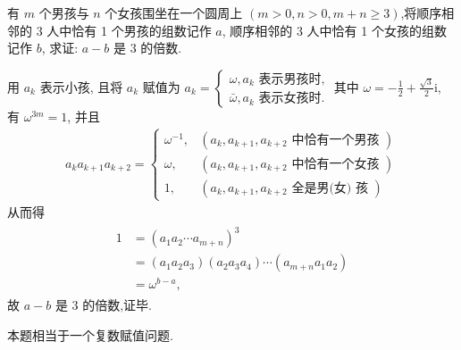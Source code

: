 \begin{exercise}
	有 $m$ 个男孩与 $n$ 个女孩围坐在一个圆周上 $(m>0, n>0, m+n \geqslant 3)$,将顺序相邻的 3 人中恰有 1 个男孩的组数记作 $a$, 顺序相邻的 3 人中恰有 1 个女孩的组数记作 $b$, 求证: $a-b$ 是 3 的倍数.
\end{exercise}
\begin{solution}
	用 $a_k$ 表示小孩, 且将 $a_k$ 赋值为 $a_k=\left\{\begin{array}{l}\omega, a_k \text { 表示男孩时, } \\ \bar{\omega}, a_k \text { 表示女孩时. }\end{array}\right.$其中 $\omega=-\frac{1}{2}+\frac{\sqrt{3}}{2} \mathrm{i}$, 有 $\omega^{3 m}=1$, 并且
	\begin{align*}
		a_k a_{k+1} a_{k+2}= \begin{cases}\omega^{-1}, & \left(a_k, a_{k+1}, a_{k+2} \text { 中恰有一个男孩 }\right) \\ \omega, & \left(a_k, a_{k+1}, a_{k+2} \text { 中恰有一个女孩 }\right) \\ 1, & \left(a_k, a_{k+1}, a_{k+2} \text { 全是男(女) 孩 }\right)\end{cases}
	\end{align*}
	从而得
	\begin{align*}
		\begin{aligned}
			1 & =\left(a_1 a_2 \cdots a_{m+n}\right)^3                                               \\
			  & =\left(a_1 a_2 a_3\right)\left(a_2 a_3 a_4\right) \cdots\left(a_{m+n} a_1 a_2\right) \\
			  & =\omega^{b-a},
		\end{aligned}
	\end{align*}
	故 $a-b$ 是 3 的倍数,证毕.
\end{solution}
\begin{note}
	本题相当于一个复数赋值问题.
\end{note}


